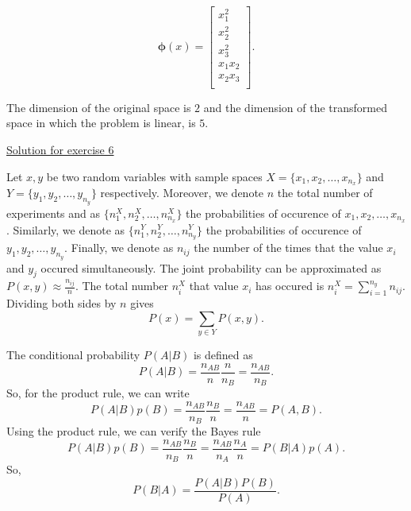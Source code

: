 \documentclass[12pt]{book}
\theoremstyle{definition}
\begin{document}
\begin{equation}
\bm{\phi}(x) = \begin{bmatrix}
x_{1}^2  \\
x_2^2 \\
x_3^2 \\
x_1x_2 \\
x_2x_3\\
\end{bmatrix}.
\end{equation}

\noindent
The dimension of the original space is $2$ and the dimension of the transformed space in which the problem is linear, is $5$.

\newpage

\vspace{0.5 cm}
\noindent
{\underline{\large Solution for exercise 6}}
\vspace{0.3 cm}

\noindent
Let $x, y$ be two random variables with sample spaces $X = \{x_1,x_2,\dots,x_{n_x}\}$ and $Y = \{y_1,y_2,\dots,y_{n_y}\}$ respectively. Moreover, we denote $n$ the total number of experiments and as $\{n_1^X,n_2^X,\dots,n_{n_x}^X\}$ the probabilities of occurence of $x_1,x_2,\dots,x_{n_x}$. Similarly, we denote as  $\{n_1^Y,n_2^Y,\dots,n_{n_y}^Y\}$ the probabilities of occurence of $y_1,y_2,\dots,y_{n_y}$. Finally, we denote as $n_{ij}$ the number of the times that the value $x_i$ and $y_j$ occured simultaneously. The joint probability can be approximated as $P(x,y) \approx \frac{n_{ij}}{n}$. The total number $n_i^X$ that value $x_i$ has occured is $n_i^X = \sum_{i=1}^{n_y}n_{ij}$. Dividing both sides by $n$ gives
\begin{equation}
P(x) = \sum_{y\in Y}P(x,y).
\end{equation}

\noindent
The conditional probability $P(A|B)$ is defined as
\begin{equation}
P(A|B) = \frac{n_{AB}}{n} \frac{n}{n_B} = \frac{n_{AB}}{n_B}.
\end{equation}
So, for the product rule, we can write
\begin{equation}
P(A|B)p(B) = \frac{n_{AB}}{n_B}\frac{n_B}{n} = \frac{n_{AB}}{n} = P(A,B).
\end{equation}
Using the product rule, we can verify the Bayes rule
\begin{equation}
P(A|B)p(B) = \frac{n_{AB}}{n_B}\frac{n_B}{n} = \frac{n_{AB}}{n_A}\frac{n_A}{n} = P(B|A)p(A).
\end{equation}
So,
\begin{equation}
P(B|A) = \frac{P(A|B)P(B)}{P(A)}.
\end{equation}
\end{document}
